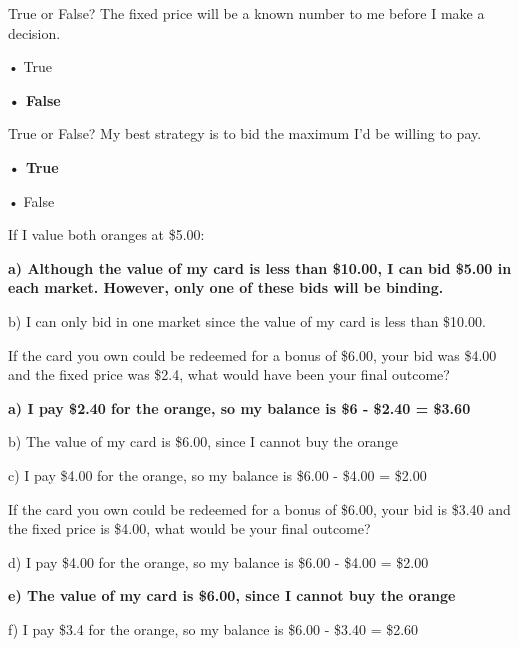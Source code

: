 \documentclass[12pt]{article}
\begin{document}
\vspace{0.5cm}

True or False? The fixed price will be a known number to me before I make a decision.  

• True  \par
\textbf{• False}\par  

\vspace{0.5cm}


\vspace{0.5cm}



True or False? My best strategy is to bid the maximum I'd be willing to pay.  

\textbf{• True}  \par
• False 

\vspace{0.5cm}

If I value both oranges at \$5.00:

\textbf{a) Although the value of my card is less than \$10.00, I can bid \$5.00 in each market. However, only one of these bids will be binding.}  

b) I can only bid in one market since the value of my card is less than \$10.00.  

\vspace{0.5cm}

If the card you own could be redeemed for a bonus of \$6.00, your bid was \$4.00 and the fixed price was \$2.4, what would have been your final outcome?  

\textbf{a) I pay \$2.40 for the orange, so my balance is \$6 - \$2.40 = \$3.60 } 

b) The value of my card is \$6.00, since I cannot buy the orange  

c) I pay \$4.00 for the orange, so my balance is \$6.00 - \$4.00 = \$2.00  

\vspace{0.5cm}

If the card you own could be redeemed for a bonus of \$6.00, your bid is \$3.40 and the fixed price is \$4.00, what would be your final outcome?  

d) I pay \$4.00 for the orange, so my balance is \$6.00 - \$4.00 = \$2.00  

\textbf{e) The value of my card is \$6.00, since I cannot buy the orange } 

f) I pay \$3.4 for the orange, so my balance is \$6.00 - \$3.40 = \$2.60  
\end{document}
